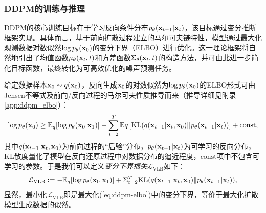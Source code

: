 \documentclass[11pt,a4paper,UTF8]{ctexart}
\begin{document}
\subsubsection{DDPM的训练与推理}

DDPM的核心训练目标在于学习反向条件分布$p_{\theta}(\mathbf{x}_{t-1}|\mathbf{x}_t)$，该目标通过变分推断框架实现\cite{sohldickstein2015diffusion}。具体而言，基于前向扩散过程建立的马尔可夫链特性，模型通过最大化观测数据对数似然$\log p_{\theta}(\mathbf{x}_0)$的变分下界（ELBO）进行优化。这一理论框架将自然地引出了均值函数$\mu_{\theta}(\mathbf{x}_t,t)$和方差函数$\Sigma_{\theta}(\mathbf{x}_t,t)$的构造方法，并可由此进一步简化目标函数，最终转化为可高效优化的噪声预测任务\cite{ho2020denoising}。

给定数据样本$\mathbf{x}_0\sim q(\mathbf{x}_0)$，反向生成$\mathbf{x}_0$的对数似然为$\log p_{\theta}(\mathbf{x}_0)$的ELBO形式可由Jensen不等式及前向/反向过程的马尔可夫性质推导而来（推导详细见附录\ref{app:ddpm_elbo}）：
\begin{equation}
\log p_{\theta}(\mathbf{x}_0) \geq \mathbb{E}_q[\log p_{\theta}(\mathbf{x}_0|\mathbf{x}_1)]  - \sum_{t=2}^{T} \mathbb{E}q \left[ \mathrm{KL} (q(\mathbf{x}_{t-1}|\mathbf{x}_t,\mathbf{x}_0)||p_\theta(\mathbf{x}_{t-1}|\mathbf{x}_t)) \right] + \text{const},
\label{eq:ddpm-elbo}
\end{equation}
其中$q(\mathbf{x}_{t-1}|\mathbf{x}_t,\mathbf{x}_0)$为前向过程的“后验”分布，$p_\theta(\mathbf{x}_{t-1}|\mathbf{x}_t)$为可学习的反向分布，KL散度量化了模型在反向还原过程中对数据分布的逼近程度，$\text{const}$项中不包含可学习的参数。于是我们可以定义\emph{变分下界损失}$\mathcal{L}_{\text{VLB}}$如下：
\begin{equation}
\mathcal{L}_{\text{VLB}} := -\mathbb{E}_q [\log p_{\theta}(\mathbf{x}_0|\mathbf{x}_1)] +  \Sigma_{t=2}^T \text{KL}(q(\mathbf{x}_{t-1}|\mathbf{x}_t,\mathbf{x}_0) \| p_{\theta}(\mathbf{x}_{t-1}|\mathbf{x}_t)),
\label{ddpm:loss_vlb}
\end{equation}
显然，最小化$\mathcal{L}_{\text{VLB}}$即是最大化(\ref{eq:ddpm-elbo})中的变分下界，等价于最大化扩散模型生成数据的似然。
\end{document}
